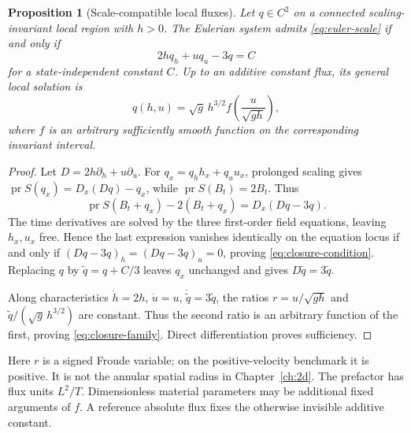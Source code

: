 \documentclass[11pt,a4paper,oneside]{report}
\numberwithin{equation}{chapter}
\newtheorem{proposition}[theorem]{Proposition}
\newcommand{\pr}{\operatorname{pr}}
\begin{document}
\begin{proposition}[Scale-compatible local fluxes]\label{prop:closure}
Let $q\in C^2$ on a connected scaling-invariant local region with $h>0$. The Eulerian system admits \eqref{eq:euler-scale} if and only if
\begin{equation}\label{eq:closure-condition}
2h q_h+u q_u-3q=C
\end{equation}
for a state-independent constant $C$. Up to an additive constant flux, its general local solution is
\begin{equation}\label{eq:closure-family}
q(h,u)=\sqrt g\,h^{3/2} f\!\left(\frac{u}{\sqrt{gh}}\right),
\end{equation}
where $f$ is an arbitrary sufficiently smooth function on the corresponding invariant interval.
\end{proposition}
\begin{proof}
Let $D=2h\partial_h+u\partial_u$. For $q_x=q_hh_x+q_uu_x$, prolonged scaling gives $\pr S(q_x)=D_x(Dq)-q_x$, while $\pr S(B_t)=2B_t$. Thus
\begin{equation}
\pr S(B_t+q_x)-2(B_t+q_x)=D_x(Dq-3q).
\end{equation}
The time derivatives are solved by the three first-order field equations, leaving $h_x,u_x$ free. Hence the last expression vanishes identically on the equation locus if and only if $(Dq-3q)_h=(Dq-3q)_u=0$, proving \eqref{eq:closure-condition}. Replacing $q$ by $\widetilde q=q+C/3$ leaves $q_x$ unchanged and gives $D\widetilde q=3\widetilde q$.

Along characteristics $\dot h=2h$, $\dot u=u$, $\dot{\widetilde q}=3\widetilde q$, the ratios $r=u/\sqrt{gh}$ and $\widetilde q/(\sqrt g\,h^{3/2})$ are constant. Thus the second ratio is an arbitrary function of the first, proving \eqref{eq:closure-family}. Direct differentiation proves sufficiency.\end{proof}
Here $r$ is a signed Froude variable; on the positive-velocity benchmark it is positive. It is not the annular spatial radius in Chapter~\ref{ch:2d}.
The prefactor has flux units $L^2/T$. Dimensionless material parameters may
be additional fixed arguments of $f$. A reference absolute flux fixes the
otherwise invisible additive constant.
\end{document}
